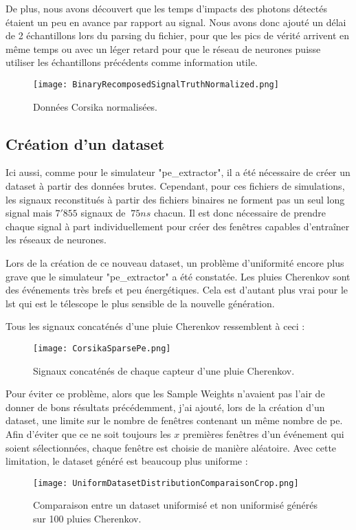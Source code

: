 De plus, nous avons découvert que les temps d'impacts des photons détectés étaient un peu en avance par rapport
au signal. Nous avons donc ajouté un délai de 2 échantillons lors du parsing du fichier, pour que les pics de vérité arrivent en 
même temps ou avec un léger retard pour que le réseau de neurones puisse utiliser les échantillons précédents comme information utile.
\newpage
\begin{figure}[tbph!]
	\centering
	\texttt{[image: BinaryRecomposedSignalTruthNormalized.png]}
	\caption[Données Corsika normalisées]{Données Corsika normalisées.}
\end{figure}

\newpage
\subsection{Création d'un dataset}
Ici aussi, comme pour le simulateur "pe\_extractor", il a été nécessaire de créer un dataset à partir des données brutes.
Cependant, pour ces fichiers de simulations, les signaux reconstitués à partir des fichiers binaires ne forment pas un seul long
signal mais $7'855$ signaux de $~75ns$ chacun. Il est donc nécessaire de prendre chaque signal à part individuellement 
pour créer des fenêtres capables d'entraîner les réseaux de neurones.

Lors de la création de ce nouveau dataset, un problème d'uniformité encore plus grave que le simulateur "pe\_extractor" a été constatée.
Les pluies Cherenkov sont des événements très brefs et peu énergétiques. Cela est d'autant plus vrai pour le \gls{lst} 
qui est le télescope le plus sensible de la nouvelle génération.

Tous les signaux concaténés d'une pluie Cherenkov ressemblent à ceci :
\begin{figure}[tbph!]
	\centering
	\texttt{[image: CorsikaSparsePe.png]}
	\caption[Signaux concaténés de chaque capteur d'une pluie Cherenkov]{Signaux concaténés de chaque capteur d'une pluie Cherenkov.}
\end{figure}

\newpage
Pour éviter ce problème, alors que les Sample Weights n'avaient pas l'air de donner de bons résultats précédemment,
j'ai ajouté, lors de la création d'un dataset, une limite sur le nombre de fenêtres contenant un même nombre de \gls{pe}. 
Afin d'éviter que ce ne soit toujours les $x$ premières fenêtres d'un événement qui soient sélectionnées, chaque fenêtre est choisie de manière aléatoire.
Avec cette limitation, le dataset généré est beaucoup plus uniforme :
\begin{figure}[tbph!]
	\centering
	\texttt{[image: UniformDatasetDistributionComparaisonCrop.png]}
	\caption[Comparaison entre un dataset uniformisé et non uniformisé générés sur 100 pluies Cherenkov]{Comparaison entre un dataset uniformisé et non uniformisé générés sur 100 pluies Cherenkov.}
\end{figure}

